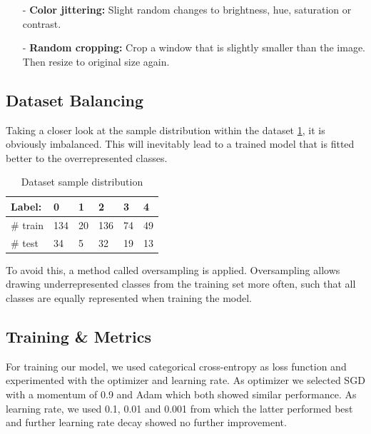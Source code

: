 \documentclass{article}
\begin{document}
\begin{itemize}
\begin{itemize}
  \end{itemize}   
  \item[-] \textbf{Color jittering:} Slight random changes to brightness, hue, saturation or contrast.
  \item[-] \textbf{Random cropping:} Crop a window that is slightly smaller than the image. Then resize to original size again.
\end{itemize}

\subsection{Dataset Balancing}
Taking a closer look at the sample distribution within the dataset \ref{tab:table1}, it is obviously imbalanced. This will inevitably lead to a trained model
that is fitted better to the overrepresented classes.

\renewcommand{\arraystretch}{1.2}
\begin{table}[h]
  \centering
  \begin{tabular}{|l|l|l|l|l|l|}
  \hline
  Label:   & 0   & 1  & 2   & 3  & 4  \\ \hline \hline
  \# train & 134 & 20 & 136 & 74 & 49 \\ \hline
  \# test  & 34  & 5  & 32  & 19 & 13 \\ \hline
  \end{tabular}
  \caption{Dataset sample distribution} \label{tab:table1}
  \end{table}

To avoid this, a method called oversampling is applied. Oversampling allows drawing underrepresented classes from the training set more often, 
such that all classes are equally represented when training the model.

\subsection{Training \& Metrics}
For training our model, we used categorical cross-entropy as loss function and experimented with the optimizer and 
learning rate. As optimizer we selected SGD with a momentum of 0.9 and Adam which both showed similar performance. 
As learning rate, we used 0.1, 0.01 and 0.001 from which the latter performed best and further learning rate decay
showed no further improvement.
\end{document}
